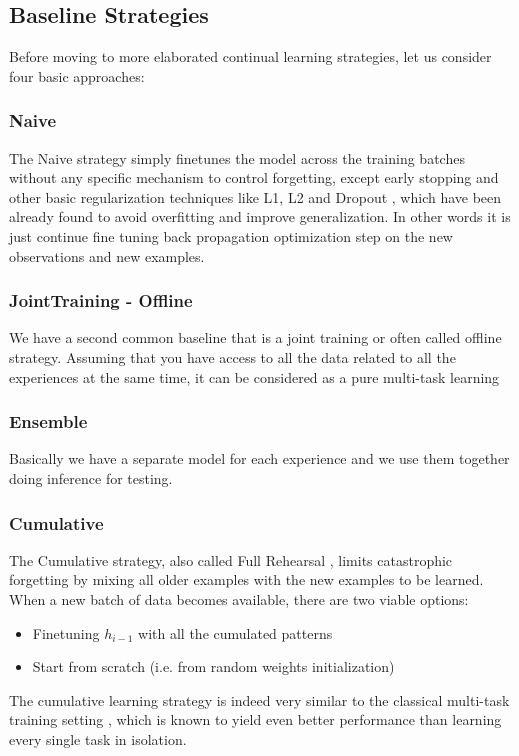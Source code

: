 \documentclass[english, LaM, oneside]{sapthesis}%
\begin{document}
        
\subsection{Baseline Strategies}
Before moving to more elaborated continual learning strategies, let us consider four basic approaches:
\subsubsection{Naive} The Naive strategy simply finetunes the model across the training batches without any specific mechanism to control forgetting, except early stopping and other basic regularization techniques like L1, L2 and Dropout \cite{goodfellow-2013}, which have been already found to avoid overfitting and improve generalization. In other words it is just continue fine tuning back propagation optimization step on the new observations and new examples.
\subsubsection{JointTraining - Offline} We have a second common baseline that is a joint training or often called offline strategy. Assuming that you have access to all the data related to all the experiences at the same time, it can be considered as a pure multi-task learning
\subsubsection{Ensemble} Basically we have a separate model for each experience and we use them together doing inference for testing.
\subsubsection{Cumulative} The Cumulative strategy, also called Full Rehearsal \cite{hayes}, limits catastrophic forgetting by mixing all older examples with the new examples to be learned. When a new batch of data becomes available, there are two viable options: 
\begin{itemize}
    \item Finetuning $h_{i - 1}$ with all the cumulated patterns
    \item Start from scratch (i.e. from random weights initialization)
\end{itemize}
The cumulative learning strategy is indeed very similar to the classical multi-task training setting \cite{caruana}, which is known to yield even better performance than learning every single task in isolation.
\end{document}

